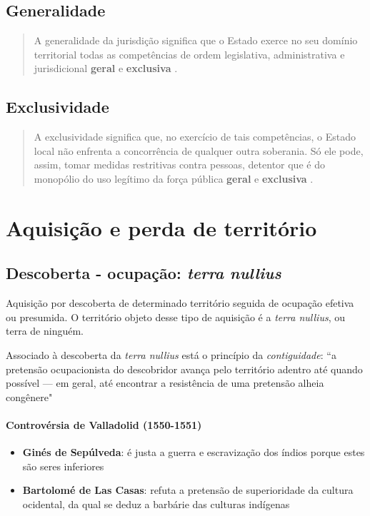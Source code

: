 \documentclass{article}
\begin{document}
\subsection{Generalidade}

\begin{quote}
    A generalidade da jurisdição significa que o Estado exerce no seu domínio territorial todas as competências de ordem legis­lativa, administrativa e jurisdicional \textbf{geral} e \textbf{exclusiva} \cite[p.~72]{rezek_direito_2024}.
\end{quote}

\subsection{Exclusividade}

\begin{quote}
    A exclusividade significa que, no exercício de tais competências, o Estado local não enfrenta a concorrência de qualquer outra soberania. Só ele pode, assim, tomar medidas restritivas contra pessoas, detentor que é do monopólio do uso legítimo da força pública \textbf{geral} e \textbf{exclusiva} \cite[p.~72]{rezek_direito_2024}.
\end{quote}

\section{Aquisição e perda de território}

\subsection{Descoberta - ocupação: \textit{terra nullius}}

Aquisição por descoberta de determinado território seguida de ocupação efetiva ou presumida. O território objeto desse tipo de aquisição é a \textit{terra nullius}, ou terra de ninguém.

Associado à descoberta da \textit{terra nullius} está o princípio da \textit{contiguidade}: ``a pretensão ocupacionista do descobridor avança pelo território adentro até quando possível — em geral, até encontrar a resistência de uma pretensão alheia congênere" \cite[p.~73]{rezek_direito_2024}

\paragraph{Controvérsia de Valladolid (1550-1551)}
\begin{itemize}
    \item \textbf{Ginés de Sepúlveda}: é justa a guerra e escravização dos índios porque estes são seres inferiores
    \item \textbf{Bartolomé de Las Casas}: refuta a pretensão de superioridade da cultura ocidental, da qual se deduz a barbárie das culturas indígenas
\end{itemize}
\end{document}
